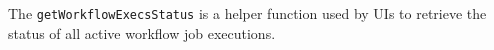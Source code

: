 The \verb+getWorkflowExecsStatus+ is a helper function used by UIs to retrieve the status of all active workflow job executions.
